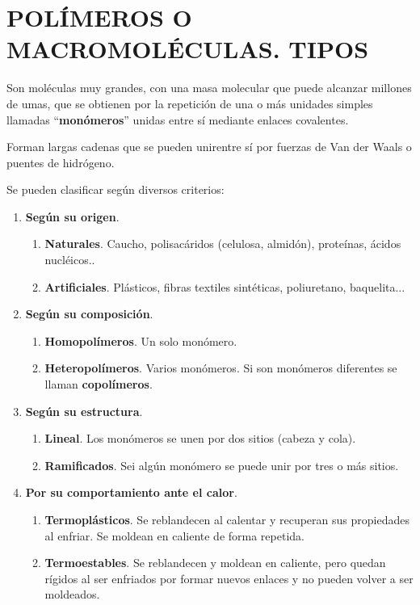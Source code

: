 

    \section{POLÍMEROS O MACROMOLÉCULAS. TIPOS}

    Son moléculas muy grandes, con una  masa molecular que puede alcanzar millones de umas, que se obtienen por la
    repetición de una o más unidades simples llamadas “\textbf{monómeros}” unidas entre sí mediante enlaces covalentes.

    Forman largas cadenas que se pueden unirentre sí por fuerzas de Van der Waals o puentes de hidrógeno.

    Se pueden clasificar según diversos criterios:

    \begin{enumerate}[label=\numberballmDarkTeal]
        \item \textbf{Según su origen}.
        \begin{enumerate}[label=\letraminuscula]
            \item \textbf{Naturales}.
            Caucho, polisacáridos (celulosa, almidón),
            proteínas, ácidos nucléicos..
            \item \textbf{Artificiales}. Plásticos,
            fibras textiles sintéticas, poliuretano, baquelita...


        \end{enumerate}
        \item \textbf{Según su composición}.
        \begin{enumerate}[label=\letraminuscula]
            \item \textbf{Homopolímeros}. Un solo monómero.
            \item \textbf{Heteropolímeros}. Varios monómeros. Si son monómeros diferentes se llaman \textbf{copolímeros}.
        \end{enumerate}
        \item \textbf{Según su estructura}.
        \begin{enumerate}[label=\letraminuscula]
            \item \textbf{Lineal}. Los monómeros se unen por dos sitios (cabeza y cola).
            \item \textbf{Ramificados}. Sei algún monómero se puede unir por tres o más sitios.
        \end{enumerate}
        \item \textbf{Por su comportamiento ante el calor}.
        \begin{enumerate}[label=\letraminuscula]
            \item \textbf{Termoplásticos}. Se reblandecen al calentar y recuperan sus propiedades al enfriar. Se moldean en caliente de forma repetida.
            \item \textbf{Termoestables}. Se reblandecen y moldean en caliente, pero quedan rígidos al ser enfriados por formar nuevos enlaces y no pueden volver a ser moldeados.
        \end{enumerate}
    \end{enumerate}


